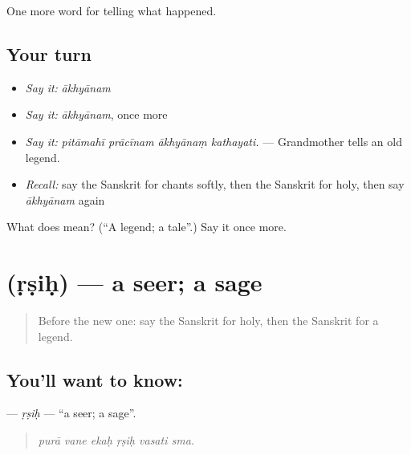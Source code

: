 \begin{grammarlens}[title={What you've built}]
One more word for telling what happened.
\end{grammarlens}

\subsection*{Your turn}
\begin{itemize}
\raggedright
  \item \emph{Say it:} \emph{ākhyānam}
  \item \emph{Say it:} \emph{ākhyānam}, once more
  \item \emph{Say it:} \emph{pitāmahī prācīnam ākhyānaṃ kathayati.} — Grandmother tells an old legend.
  \item \emph{Recall:} say the Sanskrit for chants softly, then the Sanskrit for holy, then say \emph{ākhyānam} again
\end{itemize}

\begin{tcolorbox}[breakable,colback=teal!4,colframe=teal!35!black,title={Before you move on}]
What does  mean? (\textquotedblleft{}A legend; a tale\textquotedblright{}.) Say it once more.
\end{tcolorbox}
\section[\texorpdfstring{\sk{ऋषिः} (ṛṣiḥ)}{ऋषिः (ṛṣiḥ)}]{ (ṛṣiḥ) — a seer; a sage}

\label{lesson:SA-C332-rsih}



\begin{quote}
Before the new one: say the Sanskrit for holy, then the Sanskrit for a legend.
\end{quote}

\subsection*{You'll want to know: }
\textbf{} — \emph{ṛṣiḥ} — \textquotedblleft{}a seer; a sage\textquotedblright{}.

\begin{quote}
     
\end{quote}

\begin{quote}
\emph{purā vane ekaḥ ṛṣiḥ vasati sma.}
\end{quote}

